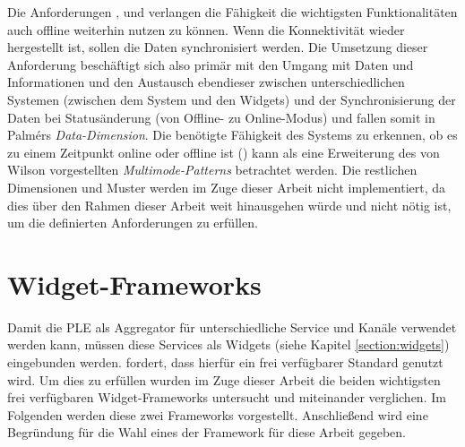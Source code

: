 Die Anforderungen ,  und  verlangen die Fähigkeit die wichtigsten Funktionalitäten auch offline weiterhin nutzen zu können. Wenn die Konnektivität wieder hergestellt ist, sollen die Daten synchronisiert werden. Die Umsetzung dieser Anforderung beschäftigt sich also primär mit den Umgang mit Daten und Informationen und den Austausch ebendieser zwischen unterschiedlichen Systemen (zwischen dem System und den Widgets) und der Synchronisierung der Daten bei Statusänderung (von Offline- zu Online-Modus) und fallen somit in Palmérs \emph{Data-Dimension}. Die benötigte Fähigkeit des Systems zu erkennen, ob es zu einem Zeitpunkt online oder offline ist () kann als eine Erweiterung des von Wilson vorgestellten \emph{Multimode-Patterns} betrachtet werden.   
Die restlichen Dimensionen und Muster werden im Zuge dieser Arbeit nicht implementiert, da dies über den Rahmen dieser Arbeit weit hinausgehen würde und nicht nötig ist, um die definierten Anforderungen zu erfüllen.

\section{Widget-Frameworks}\label{section:widget_frameworks}
Damit die PLE als Aggregator für unterschiedliche Service und Kanäle verwendet werden kann, müssen diese Services als Widgets (siehe Kapitel \ref{section:widgets}) eingebunden werden.  fordert, dass hierfür ein frei verfügbarer Standard genutzt wird. Um dies zu erfüllen wurden im Zuge dieser Arbeit die beiden wichtigsten frei verfügbaren Widget-Frameworks untersucht und miteinander verglichen. Im Folgenden werden diese zwei Frameworks vorgestellt. Anschließend wird eine Begründung für die Wahl eines der Framework für diese Arbeit gegeben.

